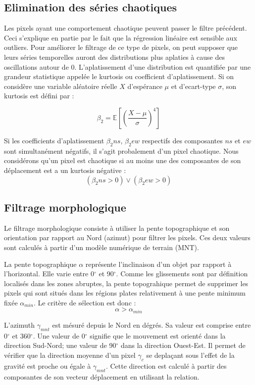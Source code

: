 \documentclass[11pt, openany]{report}
\begin{document}
\subsection{Elimination des séries chaotiques}
Les pixels ayant une comportement chaotique peuvent passer le filtre précédent. Ceci s'explique en partie par le fait que la régression linéaire est sensible aux outliers. Pour améliorer le filtrage de ce type de pixels, on peut supposer que leurs séries temporelles auront des distributions plus aplaties à cause  des oscillations autour de 0. L'aplatissement d'une distribution est quantifiée par une grandeur statistique appelée le kurtosis ou coefficient d'aplatissement. Si on considère une variable aléatoire réelle $X$ d'espérance $\mu$ et d'ecart-type $\sigma$, son kurtosis est défini par :

\[ \beta_{2} = \mathbb{E} \left[ \left( \dfrac{X - \mu}{\sigma} \right)^{4}  \right] \]

Si les coefficients d'aplatissement $\beta_{2}{ns}$, $\beta_{2}{ew}$  respectifs des composantes $ns$ et $ew$ sont simultanément négatifs, il s'agit probalement d'un pixel chaotique. Nous considérons qu'un pixel est chaotique si au moins une des composantes de son déplacement est a un kurtosis négative :
\[  \left(\beta_{2}{ns} > 0 \right)  \vee  \left( \beta_{2}{ew} > 0 \right) \]


\subsection{Filtrage morphologique}
Le filtrage morphologique consiste à utiliser la pente topographique et son orientation par rapport au Nord (azimut) pour filtrer les pixels. Ces deux valeurs sont calculés à partir d'un modèle numérique de terrain (MNT).

La pente topographique $\alpha$ représente l'inclinaison d'un objet par rapport à l'horizontal. Elle varie entre 0$^{\circ}$ et 90$^{\circ}$. Comme les glissements sont par définition localisés dans les zones abruptes, la pente topograhique permet de supprimer les pixels qui sont situés dans les régions plates relativement à une pente minimum fixée $\alpha_{min}$. Le critère de  sélection est donc :
\[ \alpha > \alpha_{min} \]

L'azimuth $\gamma_{mnt}$ est mésuré depuis le Nord en dégrés. Sa valeur est comprise entre 0$^{\circ}$ et 360$^{\circ}$.
Une valeur de 0$^{\circ}$ signifie que le mouvement est orienté dans la direction Sud-Nord; une valeur de 90$^{\circ}$ dans la direction Ouest-Est. Il permet de vérifier que la direction moyenne d'un pixel $\gamma_{c}$ se deplaçant sous l'effet de la gravité est proche ou égale à $\gamma_{mnt}$. Cette direction est calculé à partir des composantes de son vecteur déplacement en utilisant la relation. 
\end{document}
